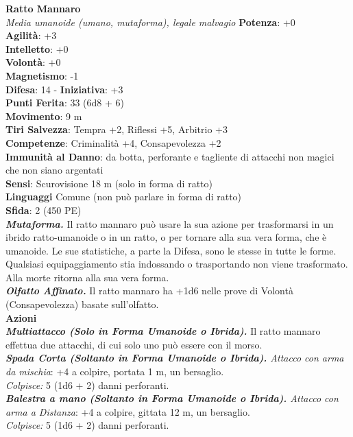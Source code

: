 \begin{multicols}{2}
\medskip\textbf{Ratto Mannaro}\\
\emph{Media umanoide (umano, mutaforma), legale malvagio}
\textbf{Potenza}: +0\\
\textbf{Agilità}: +3\\
\textbf{Intelletto}: +0\\
\textbf{Volontà}: +0\\
\textbf{Magnetismo}: -1\\
\textbf{Difesa}: 14 - \textbf{Iniziativa}: +3\\
\textbf{Punti Ferita}: 33 (6d8 + 6)\\
\textbf{Movimento}: 9 m\\
\textbf{Tiri Salvezza}: Tempra +2, Riflessi +5, Arbitrio +3\\
\textbf{Competenze}: Criminalità +4, Consapevolezza +2\\
\textbf{Immunità al Danno}: da botta, perforante e tagliente di attacchi non magici che non siano argentati\\
\textbf{Sensi}: Scurovisione 18 m (solo in forma di ratto)\\
\textbf{Linguaggi} Comune (non può parlare in forma di ratto)\\
\textbf{Sfida}: 2 (450 PE)\smallskip\\
\emph{\textbf{Mutaforma.}} Il ratto mannaro può usare la sua azione per trasformarsi in un ibrido ratto-umanoide o in un ratto, o per tornare alla sua vera forma, che è umanoide. Le sue statistiche, a parte la Difesa, sono le stesse in tutte le forme. Qualsiasi equipaggiamento stia indossando o trasportando non viene trasformato. Alla morte ritorna alla sua vera forma.\\
\emph{\textbf{Olfatto Affinato.}} Il ratto mannaro ha +1d6 nelle prove di Volontà (Consapevolezza) basate sull'olfatto.\\
\smallskip\textbf{Azioni}\\

\emph{\textbf{Multiattacco (Solo in Forma Umanoide o Ibrida).}} Il ratto mannaro effettua due attacchi, di cui solo uno può essere con il morso.\\
\emph{\textbf{Spada Corta (Soltanto in Forma Umanoide o Ibrida).} Attacco con arma da mischia}: +4 a colpire, portata 1 m, un bersaglio.\\
\emph{Colpisce:} 5 (1d6 + 2) danni perforanti.\\

\emph{\textbf{Balestra a mano (Soltanto in Forma Umanoide o Ibrida).} Attacco con arma a Distanza}: +4 a colpire, gittata 12 m, un bersaglio.\\
\emph{Colpisce:} 5 (1d6 + 2) danni perforanti.\\


\end{multicols}
